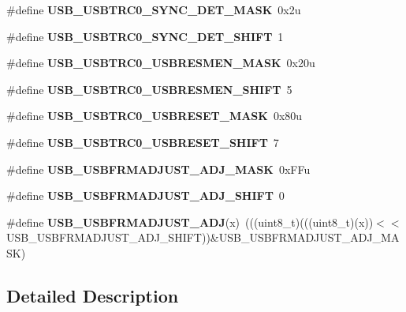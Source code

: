 \begin{DoxyCompactItemize}
\#define {\bfseries U\+S\+B\+\_\+\+U\+S\+B\+T\+R\+C0\+\_\+\+S\+Y\+N\+C\+\_\+\+D\+E\+T\+\_\+\+M\+A\+SK}~0x2u
\item 
\mbox{\label{group___u_s_b___register___masks_ga986ea3386acad15ab845a8c5d9644c9e}} 
\#define {\bfseries U\+S\+B\+\_\+\+U\+S\+B\+T\+R\+C0\+\_\+\+S\+Y\+N\+C\+\_\+\+D\+E\+T\+\_\+\+S\+H\+I\+FT}~1
\item 
\mbox{\label{group___u_s_b___register___masks_gaf236b1fdfa7f7dab54961c74538dfb75}} 
\#define {\bfseries U\+S\+B\+\_\+\+U\+S\+B\+T\+R\+C0\+\_\+\+U\+S\+B\+R\+E\+S\+M\+E\+N\+\_\+\+M\+A\+SK}~0x20u
\item 
\mbox{\label{group___u_s_b___register___masks_ga4b62f293769f60cae99319d6bb1299e8}} 
\#define {\bfseries U\+S\+B\+\_\+\+U\+S\+B\+T\+R\+C0\+\_\+\+U\+S\+B\+R\+E\+S\+M\+E\+N\+\_\+\+S\+H\+I\+FT}~5
\item 
\mbox{\label{group___u_s_b___register___masks_ga3b307f8358be6942775121b6a92243ab}} 
\#define {\bfseries U\+S\+B\+\_\+\+U\+S\+B\+T\+R\+C0\+\_\+\+U\+S\+B\+R\+E\+S\+E\+T\+\_\+\+M\+A\+SK}~0x80u
\item 
\mbox{\label{group___u_s_b___register___masks_gab20fcb9276a34cbbd33ac0364c419f13}} 
\#define {\bfseries U\+S\+B\+\_\+\+U\+S\+B\+T\+R\+C0\+\_\+\+U\+S\+B\+R\+E\+S\+E\+T\+\_\+\+S\+H\+I\+FT}~7
\item 
\mbox{\label{group___u_s_b___register___masks_ga3bbdc3dbdf46947a16a7b4429ad9a0c7}} 
\#define {\bfseries U\+S\+B\+\_\+\+U\+S\+B\+F\+R\+M\+A\+D\+J\+U\+S\+T\+\_\+\+A\+D\+J\+\_\+\+M\+A\+SK}~0x\+F\+Fu
\item 
\mbox{\label{group___u_s_b___register___masks_ga81985f8c59f9aa0c0340a70136b55098}} 
\#define {\bfseries U\+S\+B\+\_\+\+U\+S\+B\+F\+R\+M\+A\+D\+J\+U\+S\+T\+\_\+\+A\+D\+J\+\_\+\+S\+H\+I\+FT}~0
\item 
\mbox{\label{group___u_s_b___register___masks_ga9425a289b2e719d6aad583a33ddf1e4b}} 
\#define {\bfseries U\+S\+B\+\_\+\+U\+S\+B\+F\+R\+M\+A\+D\+J\+U\+S\+T\+\_\+\+A\+DJ}(x)~(((uint8\+\_\+t)(((uint8\+\_\+t)(x))$<$$<$U\+S\+B\+\_\+\+U\+S\+B\+F\+R\+M\+A\+D\+J\+U\+S\+T\+\_\+\+A\+D\+J\+\_\+\+S\+H\+I\+FT))\&U\+S\+B\+\_\+\+U\+S\+B\+F\+R\+M\+A\+D\+J\+U\+S\+T\+\_\+\+A\+D\+J\+\_\+\+M\+A\+SK)
\end{DoxyCompactItemize}


\subsection{Detailed Description}
